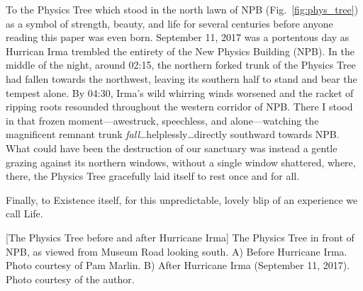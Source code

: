 To the Physics Tree which stood in the north lawn of NPB (Fig.~\ref{fig:phys_tree}) as a symbol of strength, beauty, and life for several centuries before anyone reading this paper was even born.
September 11, 2017 was a portentous day as Hurrican Irma trembled the entirety of the New Physics Building (NPB).
In the middle of the night, around 02:15, the northern forked trunk of the Physics Tree had fallen towards the northwest, leaving its southern half to stand and bear the tempest alone.
By 04:30, Irma's wild whirring winds worsened and the racket of ripping roots resounded throughout the western corridor of NPB.
There I stood in that frozen moment---awestruck, speechless, and alone---watching the magnificent remnant trunk \emph{fall}\ldots helplessly\ldots directly southward towards NPB.
What could have been the destruction of our sanctuary was instead a gentle grazing against its northern windows, without a single window shattered, where, there, the Physics Tree gracefully laid itself to rest once and for all.

Finally, to Existence itself, for this unpredictable, lovely blip of an experience we call Life.
\begin{multiFigure}
    \centering
        [The Physics Tree before and after Hurricane Irma]
        {The Physics Tree in front of NPB, as viewed from Museum Road looking south.
        \;A) Before Hurricane Irma. Photo courtesy of Pam Marlin.
        \;B) After Hurricane Irma (September 11, 2017). Photo courtesy of the author.
        }
    \label{fig:phys_tree}
\end{multiFigure}